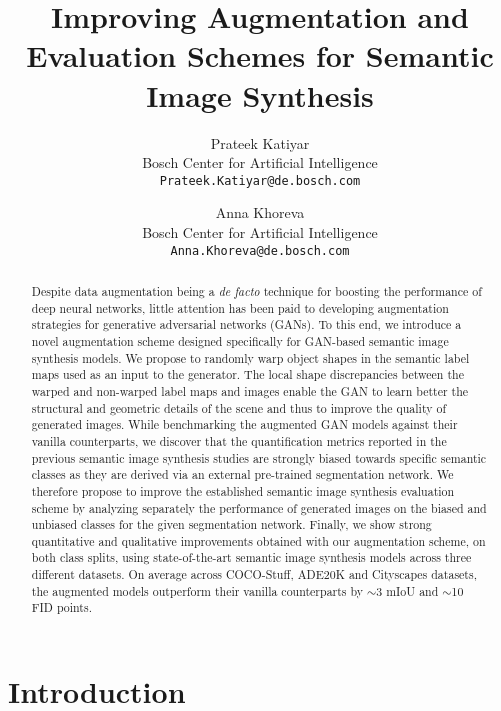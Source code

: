 \documentclass[final]{cvpr}
\newcommand\+{\mkern4mu}
\begin{document}
	

\title{Improving Augmentation and Evaluation Schemes for Semantic Image Synthesis
	}
	
	\author{Prateek Katiyar\\
		Bosch Center for Artificial Intelligence\\
		{\tt\small Prateek.Katiyar@de.bosch.com}
\and
		Anna Khoreva\\
		Bosch Center for Artificial Intelligence\\
		{\tt\small Anna.Khoreva@de.bosch.com}
	}
	
	\maketitle
	
	
\begin{abstract}
	

Despite data augmentation being a \textit{de facto} technique for boosting the performance of deep neural networks, little attention has been paid to developing augmentation strategies for generative adversarial networks (GANs). To this end, we introduce a novel augmentation scheme designed specifically for GAN-based semantic image synthesis models. We propose to randomly warp object shapes in the semantic label maps used as an input to the generator. The local shape discrepancies between the warped and non-warped label maps and images enable the GAN to learn better the structural and geometric details of the scene and thus to improve the quality of generated images.
While benchmarking the augmented GAN models against their vanilla counterparts, we discover that the quantification metrics reported in the previous semantic image synthesis studies are strongly biased towards specific semantic classes as they are derived via an external pre-trained segmentation network. We therefore propose to improve the established semantic image synthesis evaluation scheme by analyzing separately the performance of generated images on the biased and unbiased classes for the given segmentation network. Finally, we show strong quantitative and qualitative improvements obtained with our augmentation scheme, on both class splits, using state-of-the-art semantic image synthesis models across three different datasets. On average across COCO-Stuff, ADE20K and Cityscapes datasets, the augmented models outperform their vanilla counterparts by $\sim$3 mIoU and $\sim$10 FID points.
\end{abstract} 	
	\section{Introduction}
\label{sec:introduction}
\end{document}
